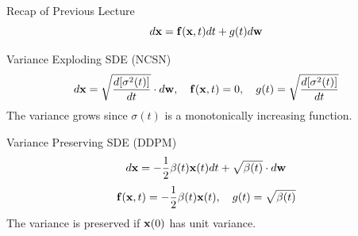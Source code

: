 \documentclass{beamer}
\begin{document}
\begin{frame}
\titlepage
\end{frame}
\begin{frame}{Recap of Previous Lecture}
	\vspace{-0.3cm}
	\[
		d\mathbf{x} = \mathbf{f}(\mathbf{x}, t) dt + g(t) d \mathbf{w}
	\]
	\vspace{-0.3cm}
	\begin{block}{Variance Exploding SDE (NCSN)}
		\vspace{-0.5cm}
		\[
			d \mathbf{x} = \sqrt{\frac{ d [\sigma^2(t)]}{dt}} \cdot d \mathbf{w}, \quad \mathbf{f}(\mathbf{x}, t) = 0, \quad g(t) = \sqrt{\frac{ d [\sigma^2(t)]}{dt}} 
		\]
		The variance grows since $\sigma(t)$ is a monotonically increasing function.
	\end{block}
	\begin{block}{Variance Preserving SDE (DDPM)}
		\vspace{-0.3cm}
		\[
			d \mathbf{x} = - \frac{1}{2} \beta(t) \mathbf{x}(t) dt + \sqrt{\beta(t)} \cdot d \mathbf{w}
		\]
		\[
			\mathbf{f}(\mathbf{x}, t) = - \frac{1}{2} \beta(t) \mathbf{x}(t) , \quad g(t) = \sqrt{\beta(t)} 
		\]
		The variance is preserved if $\mathbf{x}(0)$ has unit variance.
	\end{block}
\end{frame}
\end{document}

